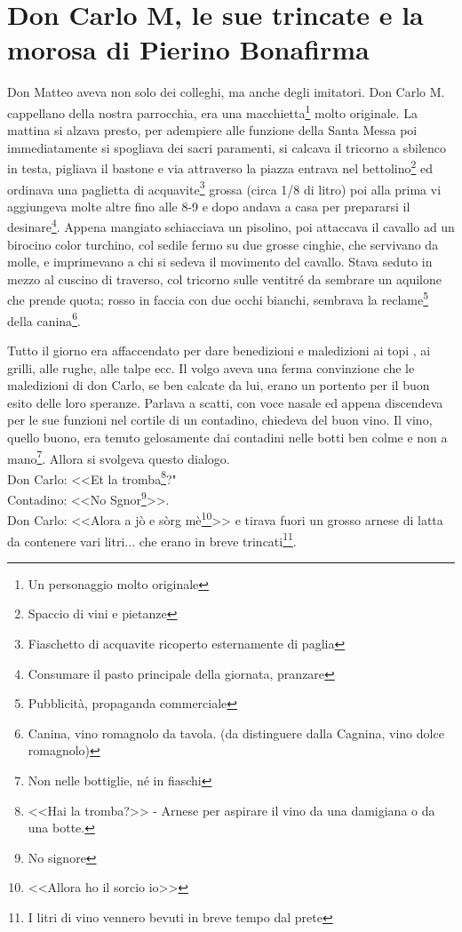 
\chapter{Don Carlo M, le sue trincate e la morosa di Pierino Bonafirma}
Don Matteo aveva non solo dei colleghi, ma anche degli imitatori. Don Carlo M. cappellano della nostra parrocchia, era una macchietta\footnote{Un personaggio molto originale} molto originale. La mattina si alzava presto, per adempiere alle funzione della Santa Messa poi immediatamente si spogliava dei sacri paramenti, si calcava il tricorno a sbilenco in testa, pigliava il bastone e via attraverso la piazza entrava nel bettolino\footnote{Spaccio di vini e pietanze} ed ordinava una paglietta di acquavite\footnote{Fiaschetto di acquavite ricoperto esternamente di paglia} grossa (circa 1/8 di litro) poi alla prima vi aggiungeva molte altre fino alle 8-9 e dopo andava a casa per prepararsi il desinare\footnote{Consumare il pasto principale della giornata, pranzare}. Appena mangiato schiacciava un pisolino, poi attaccava il cavallo ad un birocino color turchino, col sedile fermo su due grosse cinghie, che servivano da molle, e imprimevano a chi si sedeva il movimento del cavallo. Stava seduto in mezzo al cuscino di traverso, col tricorno sulle ventitré da sembrare un aquilone che prende quota; rosso in faccia con due occhi bianchi, sembrava la reclame\footnote{Pubblicità, propaganda commerciale} della canina\footnote{Canina, vino romagnolo da tavola. (da distinguere dalla Cagnina, vino dolce romagnolo)}.

Tutto il giorno era affaccendato per dare benedizioni e maledizioni ai topi , ai grilli, alle rughe, alle talpe ecc. Il volgo aveva una ferma convinzione che le maledizioni di don Carlo, se ben calcate da lui, erano un portento per il buon esito delle loro speranze. Parlava a scatti, con voce nasale ed appena discendeva per le sue funzioni nel cortile di un contadino, chiedeva del buon vino. Il vino, quello buono, era tenuto gelosamente dai contadini nelle botti ben colme e non a mano\footnote{Non nelle bottiglie, né in fiaschi}. Allora si svolgeva questo dialogo. \\
\indent Don Carlo: <<Et la tromba\footnote{<<Hai la tromba?>> - Arnese per aspirare il vino da una damigiana o da una botte.}?"\\
\indent Contadino: <<No Sgnor\footnote{No signore}>>.\\
\indent Don Carlo: <<Alora a jò e sòrg mè\footnote{<<Allora ho il sorcio io>>}>> e tirava fuori un grosso arnese di latta da contenere vari litri... che erano in breve trincati\footnote{I litri di vino vennero bevuti in breve tempo dal prete}.\\

